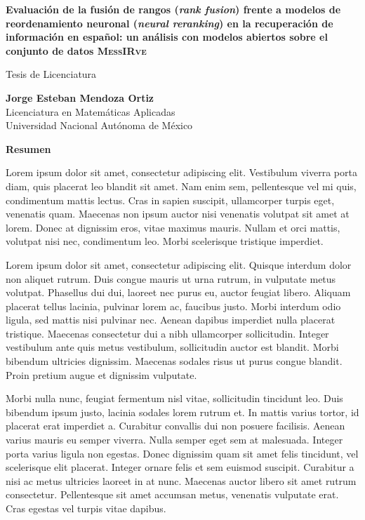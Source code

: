 
\begin{center}
\large{\bf Evaluación de la fusión de rangos (\textit{rank fusion}) frente a modelos de reordenamiento neuronal (\textit{neural reranking}) en la recuperación de información en español: un análisis con modelos abiertos sobre el conjunto de datos \textsc{MessIRve}}

\normalsize{Tesis de Licenciatura}\\
\vspace{0.5cm}

\normalsize{\bf Jorge Esteban Mendoza Ortiz}\\
Licenciatura en Matemáticas Aplicadas\\
Universidad Nacional Autónoma de México

\vspace{1.0cm}

\large{\textbf{Resumen\\}}

\end{center}
\everypar{}%
Lorem ipsum dolor sit amet, consectetur adipiscing elit. Vestibulum viverra porta diam, quis placerat leo blandit sit amet. Nam enim sem, pellentesque vel mi quis, condimentum mattis lectus. Cras in sapien suscipit, ullamcorper turpis eget, venenatis quam. Maecenas non ipsum auctor nisi venenatis volutpat sit amet at lorem. Donec at dignissim eros, vitae maximus mauris. Nullam et orci mattis, volutpat nisi nec, condimentum leo. Morbi scelerisque tristique imperdiet.

Lorem ipsum dolor sit amet, consectetur adipiscing elit. Quisque interdum dolor non aliquet rutrum. Duis congue mauris ut urna rutrum, in vulputate metus volutpat. Phasellus dui dui, laoreet nec purus eu, auctor feugiat libero. Aliquam placerat tellus lacinia, pulvinar lorem ac, faucibus justo. Morbi interdum odio ligula, sed mattis nisi pulvinar nec. Aenean dapibus imperdiet nulla placerat tristique. Maecenas consectetur dui a nibh ullamcorper sollicitudin. Integer vestibulum ante quis metus vestibulum, sollicitudin auctor est blandit. Morbi bibendum ultricies dignissim. Maecenas sodales risus ut purus congue blandit. Proin pretium augue et dignissim vulputate.

Morbi nulla nunc, feugiat fermentum nisl vitae, sollicitudin tincidunt leo. Duis bibendum ipsum justo, lacinia sodales lorem rutrum et. In mattis varius tortor, id placerat erat imperdiet a. Curabitur convallis dui non posuere facilisis. Aenean varius mauris eu semper viverra. Nulla semper eget sem at malesuada. Integer porta varius ligula non egestas. Donec dignissim quam sit amet felis tincidunt, vel scelerisque elit placerat. Integer ornare felis et sem euismod suscipit. Curabitur a nisi ac metus ultricies laoreet in at nunc. Maecenas auctor libero sit amet rutrum consectetur. Pellentesque sit amet accumsan metus, venenatis vulputate erat. Cras egestas vel turpis vitae dapibus.
 
